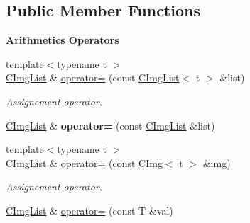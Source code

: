 \subsection*{Public Member Functions}
\begin{Indent}{\bf Arithmetics Operators}\par
{\em \label{_amgrpd43a614dc888d3c2cb46e148e3a26b2f}
 }\begin{DoxyCompactItemize}
\item 
\hypertarget{structcimg__library_1_1_c_img_list_a2687a600ed6e8f21a5e8ba041a2be77b}{
{\footnotesize template$<$typename t $>$ }\\\hyperlink{structcimg__library_1_1_c_img_list}{CImgList} \& \hyperlink{structcimg__library_1_1_c_img_list_a2687a600ed6e8f21a5e8ba041a2be77b}{operator=} (const \hyperlink{structcimg__library_1_1_c_img_list}{CImgList}$<$ t $>$ \&list)}
\label{structcimg__library_1_1_c_img_list_a2687a600ed6e8f21a5e8ba041a2be77b}

\begin{DoxyCompactList}\small\item\em Assignement operator. \item\end{DoxyCompactList}\item 
\hypertarget{structcimg__library_1_1_c_img_list_a8d3e520f7e8ba35d6ce2c9dc09d34a4a}{
\hyperlink{structcimg__library_1_1_c_img_list}{CImgList} \& {\bfseries operator=} (const \hyperlink{structcimg__library_1_1_c_img_list}{CImgList} \&list)}
\label{structcimg__library_1_1_c_img_list_a8d3e520f7e8ba35d6ce2c9dc09d34a4a}

\item 
\hypertarget{structcimg__library_1_1_c_img_list_af0a587bfba5f7240750a22fcf43b4da4}{
{\footnotesize template$<$typename t $>$ }\\\hyperlink{structcimg__library_1_1_c_img_list}{CImgList} \& \hyperlink{structcimg__library_1_1_c_img_list_af0a587bfba5f7240750a22fcf43b4da4}{operator=} (const \hyperlink{structcimg__library_1_1_c_img}{CImg}$<$ t $>$ \&img)}
\label{structcimg__library_1_1_c_img_list_af0a587bfba5f7240750a22fcf43b4da4}

\begin{DoxyCompactList}\small\item\em Assignement operator. \item\end{DoxyCompactList}\item 
\hypertarget{structcimg__library_1_1_c_img_list_a272c5c22cc764b5fefdbc8538840c47a}{
\hyperlink{structcimg__library_1_1_c_img_list}{CImgList} \& \hyperlink{structcimg__library_1_1_c_img_list_a272c5c22cc764b5fefdbc8538840c47a}{operator=} (const T \&val)}
\label{structcimg__library_1_1_c_img_list_a272c5c22cc764b5fefdbc8538840c47a}


\end{DoxyCompactItemize}
\end{Indent}
